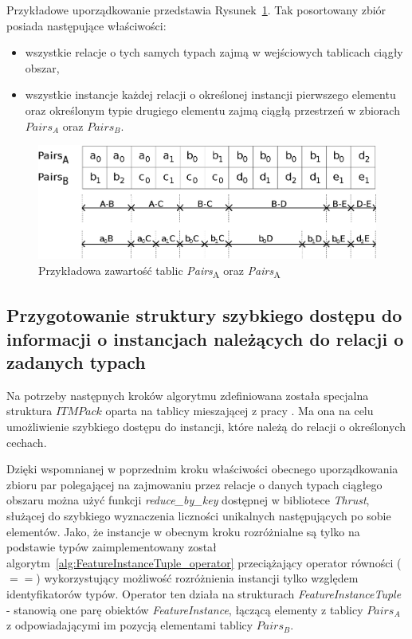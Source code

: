\documentclass[12pt]{article}
\begin{document}
Przykładowe uporządkowanie przedstawia Rysunek~\ref{fig:pairs_content}. Tak posortowany zbiór posiada następujące właściwości:
\begin{itemize}
\item wszystkie relacje o tych samych typach zajmą w wejściowych tablicach ciągły obszar,
\item wszystkie instancje każdej relacji o określonej instancji pierwszego elementu oraz określonym typie drugiego elementu zajmą ciągłą przestrzeń w zbiorach $ Pairs_{A} $ oraz $ Pairs_{B} $.
\end{itemize}

\begin{figure}[H]
\centering
\includegraphics[width=\textwidth]{order_prop1.eps}
\caption{Przykładowa zawartość tablic \textit{Pairs}\textsubscript{A} oraz \textit{Pairs}\textsubscript{A}}
\label{fig:pairs_content}
\end{figure}

\subsection{Przygotowanie struktury szybkiego dostępu do informacji o instancjach należących do relacji o zadanych typach}

Na potrzeby następnych kroków algorytmu zdefiniowana została specjalna struktura $ ITMPack $ oparta na tablicy mieszającej z pracy \cite{hashmap}. Ma ona na celu umożliwienie szybkiego dostępu do instancji, które należą do relacji o określonych cechach. 

Dzięki wspomnianej w poprzednim kroku właściwości obecnego uporządkowania zbioru par polegającej na zajmowaniu przez relacje o danych typach ciągłego obszaru można użyć funkcji \textit{reduce\_by\_key} dostępnej w bibliotece \textit{Thrust}, służącej do szybkiego wyznaczenia liczności unikalnych następujących po sobie elementów. Jako, że instancje w obecnym kroku rozróżnialne są tylko na podstawie typów zaimplementowany został algorytm~\ref{alg:FeatureInstanceTuple_operator} przeciążający operator równości ($ == $) wykorzystujący możliwość rozróżnienia instancji tylko względem identyfikatorów typów. Operator ten działa na strukturach \textit{FeatureInstanceTuple} - stanowią one parę obiektów \textit{FeatureInstance}, łączącą elementy z tablicy $ Pairs_{A} $ z odpowiadającymi im pozycją elementami tablicy $ Pairs_{B} $.
\end{document}
